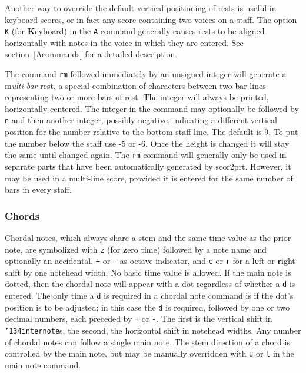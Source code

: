 \documentclass[11pt]{article}
\def\bs{{\tt\char'134}}
\def\newfrom{2.59}  %
\def\NEW#1{\ifdim#1 pt<\newfrom pt\else%
\marginpar{\fbox{#1}}\fi}
\begin{document}
Another way to override the default vertical positioning of rests is useful in
keyboard scores, or in fact any score containing two voices on a staff. 
The option {\tt K} (for {\bf K}eyboard) in the
{\tt A} command generally causes rests to be 
aligned horizontally with notes in the voice in which they are entered. See
section~\ref{Acommands} for a detailed description.

	\label{MultibarRest}The command {\tt rm} followed immediately by an 
unsigned integer will generate a {\bfi m}{\it ulti-bar} 
rest, a special combination of characters between two bar lines 
representing two or more bars of rest. The integer will always be printed, 
horizontally centered. The integer in the command \NEW{2.91}may optionally
be followed by {\tt n} and then another integer, possibly negative, indicating a
different vertical position for the number relative to the bottom staff line. 
The default is 9. To put the number
below the staff use -5 or -6. Once the height is changed it will stay the same until
changed again. The {\tt rm} command will generally only be used in separate parts 
that have been automatically generated by {\bfx scor2prt}. However, it
\NEW{2.4}may be used in a multi-line score, provided it is entered for the same
number of bars in every staff.

\subsubsection{Chords}\label{chords}

      Chordal notes, which always share a stem and the same time value as the 
prior note, are symbolized with {\tt z} (for {\bf z}ero time) followed by a note name and 
optionally an accidental, {\tt +} or {\tt -} as octave indicator, and {\tt e} 
or {\tt r} for a l{\bf e}ft or {\bf r}ight shift by one notehead width.
No basic time value is allowed.  If the main note
is dotted, then the chordal note will appear with a dot regardless of whether
a {\tt d} is entered.  The only time a {\tt d} is required in a chordal note
command is if the dot's position is to be adjusted; in this case the
{\tt d} is required, followed by one or two decimal numbers, each preceded by
{\tt +} or {\tt -}.  The first is the vertical shift in \bs{\tt internote}s;
the second, the horizontal shift in notehead widths. 
Any number of chordal notes can follow a 
single main note.  The stem direction of a chord is controlled by the main
note, but may be manually overridden with {\tt u} or {\tt l} in the main note
command.
\end{document}
